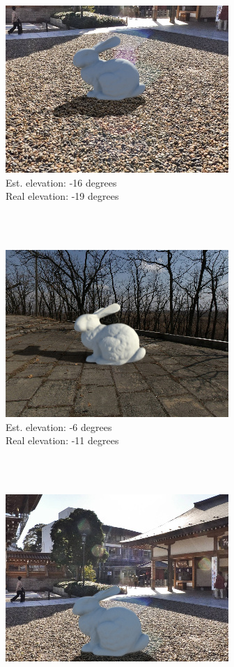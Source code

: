 \begin{multicols}{2}
\begin{minipage}{\linewidth}
\includegraphics[width=\mywidth]{pano_aaqpmaoqocdqfu_005.jpg}\\
Est. elevation: -16 degrees\\
Real elevation: -19 degrees\\
\end{minipage} \\
~\\
\begin{minipage}{\linewidth}
\includegraphics[width=\mywidth]{pano_aczfirgbavyyri_002.jpg}\\
Est. elevation: -6 degrees\\
Real elevation: -11 degrees\\
\end{minipage} \\
~\\
\begin{minipage}{\linewidth}
\includegraphics[width=\mywidth]{pano_aaqpmaoqocdqfu_002.jpg}\\

\end{minipage}
\end{multicols}
